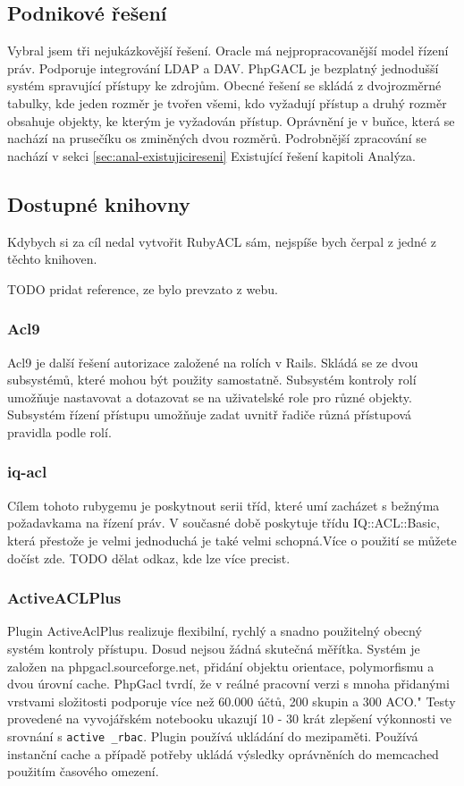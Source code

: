 \subsection{Podnikové řešení}
Vybral jsem tři nejukázkovější řešení.
Oracle má nejpropracovanější model řízení práv. Podporuje integrování LDAP a DAV.
PhpGACL je bezplatný jednodušší systém spravující přístupy ke zdrojům.
Obecné řešení se skládá z dvojrozměrné tabulky, kde jeden rozměr je tvořen všemi, kdo vyžadují přístup a druhý rozměr obsahuje objekty, ke kterým je vyžadován přístup. Oprávnění je v buňce, která se nachází na prusečíku os zminěných dvou rozměrů.
Podrobnější zpracování se nachází v sekci \ref{sec:anal-existujicireseni} Existující řešení kapitoli Analýza.

\subsection{Dostupné knihovny}
Kdybych si za cíl nedal vytvořit RubyACL sám, nejspíše bych čerpal z jedné z těchto knihoven.

TODO pridat reference, ze bylo prevzato z webu.

\subsubsection{Acl9}
Acl9 je další řešení autorizace založené na rolích v Rails. Skládá se ze dvou subsystémů, které mohou být použity samostatně. Subsystém kontroly rolí umožňuje nastavovat a dotazovat se na uživatelské role pro různé objekty. Subsystém řízení přístupu umožňuje zadat uvnitř řadiče různá přístupová pravidla podle rolí.

\subsubsection{iq-acl}
Cílem tohoto rubygemu je poskytnout serii tříd, které umí zacházet s bežnýma požadavkama na řízení práv. V současné době poskytuje třídu IQ::ACL::Basic, která přestože je velmi jednoduchá je také velmi schopná.Více o použití se můžete dočíst zde. TODO dělat odkaz, kde lze více precist.

\subsubsection{ActiveACLPlus}
Plugin ActiveAclPlus realizuje flexibilní, rychlý a snadno použitelný obecný systém kontroly přístupu.
Dosud nejsou žádná skutečná měřítka. Systém je založen na phpgacl.sourceforge.net, přidání objektu orientace, polymorfismu a dvou úrovní cache. PhpGacl tvrdí, že v reálné pracovní verzi s mnoha přidanými vrstvami složitosti podporuje více než 60.000 účtů, 200 skupin a 300 ACO." Testy provedené na vyvojářském notebooku ukazují 10 - 30 krát zlepšení výkonnosti ve srovnání s \verb|active _rbac|.
Plugin používá ukládání do mezipaměti. Používá instanční cache a případě potřeby ukládá výsledky oprávněních do memcached použitím časového omezení.